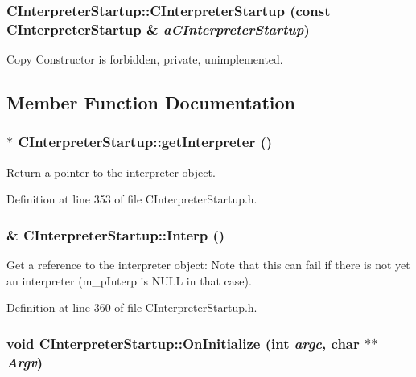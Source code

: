 \subsubsection{\setlength{\rightskip}{0pt plus 5cm}CInterpreter\-Startup::CInterpreter\-Startup (const CInterpreter\-Startup \& {\em a\-CInterpreter\-Startup})\hspace{0.3cm}{\tt  [private]}}\label{classCInterpreterStartup_c1}


Copy Constructor is forbidden, private, unimplemented.



\subsection{Member Function Documentation}
\subsubsection{$\ast$ CInterpreter\-Startup::get\-Interpreter ()\hspace{0.3cm}{\tt  [inline]}}\label{classCInterpreterStartup_a2}


Return a pointer to the interpreter object.



Definition at line 353 of file CInterpreter\-Startup.h.
\subsubsection{\& CInterpreter\-Startup::Interp ()\hspace{0.3cm}{\tt  [inline]}}\label{classCInterpreterStartup_a3}


Get a reference to the interpreter object: Note that this can fail if there is not yet an interpreter (m\_\-p\-Interp is NULL in that case). 

Definition at line 360 of file CInterpreter\-Startup.h.
\subsubsection{\setlength{\rightskip}{0pt plus 5cm}void CInterpreter\-Startup::On\-Initialize (int {\em argc}, char $\ast$$\ast$ {\em Argv})\hspace{0.3cm}{\tt  [protected, virtual]}}\label{classCInterpreterStartup_b0}



